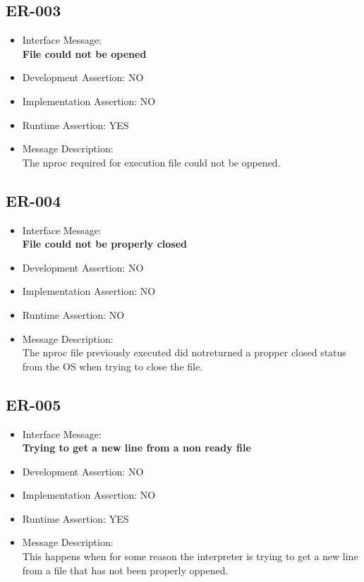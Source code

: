 \subsection{ER-003}
\begin{itemize}
  \item Interface Message:\\[1em]
    \textbf{File could not be opened}
  \item Development Assertion: NO
  \item Implementation Assertion: NO
  \item Runtime Assertion: YES
  \item Message Description:\\[1em]
    The nproc required for execution file could not be oppened.
\end{itemize}

\subsection{ER-004}
\begin{itemize}
  \item Interface Message:\\[1em]
    \textbf{File could not be properly closed}
  \item Development Assertion: NO
  \item Implementation Assertion: NO
  \item Runtime Assertion: NO
  \item Message Description:\\[1em]
    The nproc file previously executed did notreturned a propper closed status from the OS when trying to close the file.
\end{itemize}

\subsection{ER-005}
\begin{itemize}
  \item Interface Message:\\[1em]
    \textbf{Trying to get a new line from a non ready file}
  \item Development Assertion: NO
  \item Implementation Assertion: NO
  \item Runtime Assertion: YES
  \item Message Description:\\[1em]
    This happens when for some reason the interpreter is trying to get a new line from a file that has not been properly oppened.
\end{itemize}

